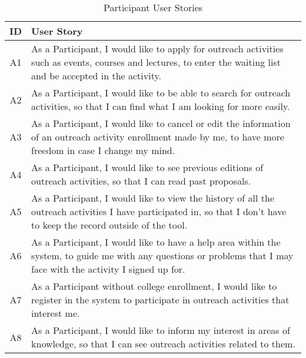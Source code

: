 \begin{table}[!htb]
  \centering
  \setlength{\aboverulesep}{0pt}
  \setlength{\belowrulesep}{0pt}
  \caption{Participant User Stories}
  \label{tab:participant-user-stories}
  \footnotesize
  \begin{tabularx}{\textwidth}{c|X}
    \toprule
    \rowcolor[rgb]{0.753,0.753,0.753} \textbf{ID} & \textbf{User Story}                   \\
    \hline
    \rowcolor[rgb]{0.898,0.898,0.898} A1          & As a Participant, I would like to apply for outreach activities such as events, courses and lectures, to enter the waiting list and be accepted in the activity.                                          \\
    A2                                            & As a Participant, I would like to be able to search for outreach activities, so that I can find what I am looking for more easily.                                     \\
    \rowcolor[rgb]{0.898,0.898,0.898} A3          & As a Participant, I would like to cancel or edit the information of an outreach activity enrollment made by me, to have more freedom in case I change my mind.                                \\
    A4                                            & As a Participant, I would like to see previous editions of outreach activities, so that I can read past proposals.                              \\
    \rowcolor[rgb]{0.898,0.898,0.898} A5          & As a Participant, I would like to view the history of all the outreach activities I have participated in, so that I don't have to keep the record outside of the tool.                                \\
    A6                                            & As a Participant, I would like to have a help area within the system, to guide me with any questions or problems that I may face with the activity I signed up for.                              \\
    \rowcolor[rgb]{0.898,0.898,0.898} A7          & As a Participant without college enrollment, I would like to register in the system to participate in outreach activities that interest me.                                \\
    A8                                            & As a Participant, I would like to inform my interest in areas of knowledge, so that I can see outreach activities related to them.                              \\

\end{tabularx}
\end{table}
